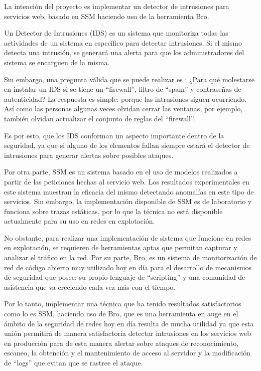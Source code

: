 La intención del proyecto es implementar un detector de intrusiones para servicios web, basado en SSM haciendo uso de la herramienta Bro.

Un Detector de Intrusiones (IDS) es un sistema que monitoriza todas las actividades de un sistema en específico para detectar intrusiones\cite{IDSdef}. Si el mismo detecta una intrusión, se generará una alerta para que los administradores del sistema se encarguen de la misma.

Sin embargo, una pregunta válida que se puede realizar es : ¿Para qué molestarse en instalar un IDS si se tiene un ``firewall'', filtro de ``spam'' y contraseñas de autenticidad? La respuesta es simple: porque las intrusiones siguen ocurriendo. Así como las personas algunas veces olvidan cerrar las ventanas, por ejemplo, también olvidan actualizar el conjunto de reglas del ``firewall''. \cite{IDSimportance}

Es por esto, que los IDS conforman un aspecto importante dentro de la seguridad, ya que si alguno de los elementos fallan siempre estará el detector de intrusiones para generar alertas sobre posibles ataques.

Por otra parte, SSM es un sistema basado en el uso de modelos realizados a partir de las peticiones hechas al servicio web. Los resultados experimentales en este sistema muestran la eficacia del mismo detectando anomalías en este tipo de servicios. Sin embargo, la implementación disponible de SSM es de laboratorio y funciona sobre trazas estáticas, por lo que la técnica no está disponible actualmente para su uso en redes en explotación.

No obstante, para realizar una implementación de sistema que funcione en redes en explotación, se requieren de herramientas aptas que permitan capturar y analizar el tráfico en la red. Por su parte, Bro, es un sistema de monitorización de red de código abierto muy utilizado hoy en día para el desarrollo de mecanismos de seguridad que posee: su propio lenguaje de ``scripting'' y una comunidad de asistencia que va creciendo cada vez más con el tiempo.

Por lo tanto, implementar una técnica que ha tenido resultados satisfactorios como lo es SSM, haciendo uso de Bro, que es una herramienta en auge en el ámbito de la seguridad de redes hoy en día resulta de mucha utilidad ya que esta unión permitirá de manera satisfactoria detectar intrusiones en los servicios web en producción para de esta manera alertar sobre ataques de reconocimiento, escaneo, la obtención y el mantenimiento de acceso al servidor y la modificación de ``logs'' que evitan que se rastree el ataque.


